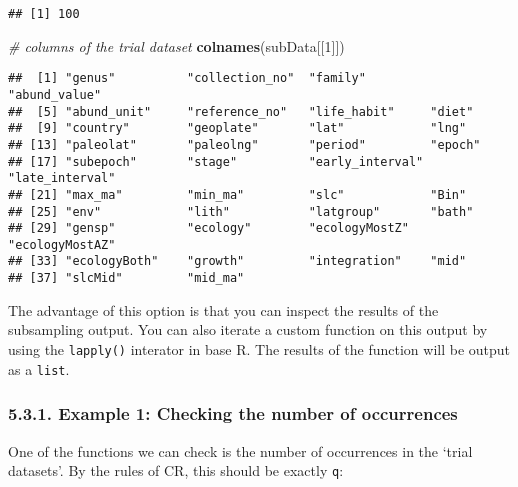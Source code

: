 \documentclass[]{article}
\newenvironment{Shaded}{\begin{snugshade}}{\end{snugshade}}
\newcommand{\KeywordTok}[1]{\textcolor[rgb]{0.13,0.29,0.53}{\textbf{{#1}}}}
\newcommand{\DecValTok}[1]{\textcolor[rgb]{0.00,0.00,0.81}{{#1}}}
\newcommand{\StringTok}[1]{\textcolor[rgb]{0.31,0.60,0.02}{{#1}}}
\newcommand{\CommentTok}[1]{\textcolor[rgb]{0.56,0.35,0.01}{\textit{{#1}}}}
\newcommand{\NormalTok}[1]{{#1}}
\begin{document}
\begin{verbatim}
## [1] 100
\end{verbatim}

\begin{Shaded}
\begin{Highlighting}[]
\CommentTok{# columns of the trial dataset}
\KeywordTok{colnames}\NormalTok{(subData[[}\DecValTok{1}\NormalTok{]])}
\end{Highlighting}
\end{Shaded}

\begin{verbatim}
##  [1] "genus"          "collection_no"  "family"         "abund_value"   
##  [5] "abund_unit"     "reference_no"   "life_habit"     "diet"          
##  [9] "country"        "geoplate"       "lat"            "lng"           
## [13] "paleolat"       "paleolng"       "period"         "epoch"         
## [17] "subepoch"       "stage"          "early_interval" "late_interval" 
## [21] "max_ma"         "min_ma"         "slc"            "Bin"           
## [25] "env"            "lith"           "latgroup"       "bath"          
## [29] "gensp"          "ecology"        "ecologyMostZ"   "ecologyMostAZ" 
## [33] "ecologyBoth"    "growth"         "integration"    "mid"           
## [37] "slcMid"         "mid_ma"
\end{verbatim}

The advantage of this option is that you can inspect the results of the
subsampling output. You can also iterate a custom function on this
output by using the \texttt{lapply()} interator in base R. The results
of the function will be output as a \texttt{list}.

\subsubsection{5.3.1. Example 1: Checking the number of
occurrences}\label{example-1-checking-the-number-of-occurrences}

One of the functions we can check is the number of occurrences in the
`trial datasets'. By the rules of CR, this should be exactly \texttt{q}:

\begin{Shaded}
\end{Shaded}
\end{document}
